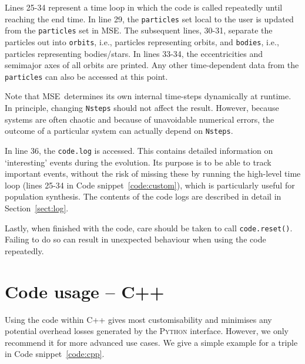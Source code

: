 \documentclass[a4paper,11pt]{article}
\newcommand{\mse}{\textsc{MSE}}
\renewcommand{\S}{Section}
\newcommand{\code}{Code snippet}
\begin{document}
Lines 25-34 represent a time loop in which the code is called repeatedly until reaching the end time. In line 29, the \texttt{particles} set local to the user is updated from the \texttt{particles} set in \mse. The subsequent lines, 30-31, separate the particles out into \texttt{orbits}, i.e., particles representing orbits, and \texttt{bodies}, i.e., particles representing bodies/stars. In lines 33-34, the eccentricities and semimajor axes of all orbits are printed. Any other time-dependent data from the \texttt{particles} can also be accessed at this point. 

\begin{leftbar}
Note that \mse~determines its own internal time-steps dynamically at runtime. In principle, changing \texttt{Nsteps} should not affect the result. However, because systems are often chaotic and because of unavoidable numerical errors, the outcome of a particular system can actually depend on \texttt{Nsteps}.
\end{leftbar}

In line 36, the \texttt{code.log} is accessed. This contains detailed information on `interesting' events during the evolution. Its purpose is to be able to track important events, without the risk of missing these by running the high-level time loop (lines 25-34 in \code~\ref{code:custom}), which is particularly useful for population synthesis. The contents of the code logs are described in detail in \S~\ref{sect:log}.

Lastly, when finished with the code, care should be taken to call \texttt{code.reset()}. Failing to do so can result in unexpected behaviour when using the code repeatedly.


\section{Code usage -- \textsc{C++}}
Using the code within \textsc{C++} gives most customisability and minimises any potential overhead losses generated by the \textsc{Python} interface. However, we only recommend it for more advanced use cases. We give a simple example for a triple in \code~\ref{code:cpp}. 
\end{document}
